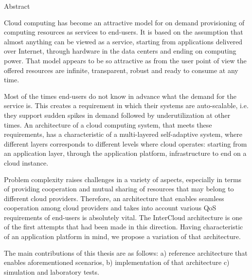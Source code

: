 \vspace*{0.5cm}

\begin{center}
  \LARGE Abstract
\end{center}

Cloud computing has become an attractive model for on demand provisioning of computing resources as services to end-users. It is based on the assumption that almost anything can be viewed as a service, starting from applications delivered over Internet, through hardware in the data centers and ending on computing power. That model appears to be so attractive as from the user point of view the offered resources are infinite, transparent, robust and ready to consume at any time.

Most of the times end-users do not know in advance what the demand for the service is. This creates a requirement in which their systems are auto-scalable, i.e. they support sudden spikes in demand followed by underutilization at other times. An architecture of a cloud computing system, that meets these requirements, has a characteristic of a multi-layered self-adaptive system, where different layers corresponds to different levels where cloud operates: starting from an application layer, through the application platform, infrastructure to end on a cloud instance.

Problem complexity raises challenges in a variety of aspects, especially in terms of providing cooperation and mutual sharing of resources that may belong to different cloud providers. Therefore, an architecture that enables seamless cooperation among cloud providers and takes into account various QoS requirements of end-users is absolutely vital. The InterCloud architecture is one of the first attempts that had been made in this direction. Having characteristic of an application platform in mind, we propose a variation of that architecture.

The main contributions of this thesis are as follows: a) reference architecture that enables aforementioned scenarios, b) implementation of that architecture c) simulation and laboratory tests.
